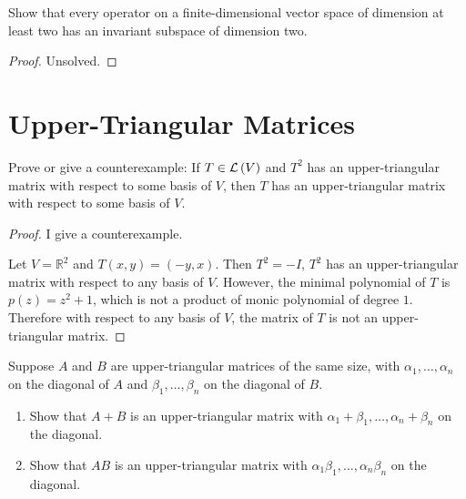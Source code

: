 \begin{exercise}
    Show that every operator on a finite-dimensional vector space of dimension at least two has an invariant subspace of dimension two.
\end{exercise}

\begin{proof}
    Unsolved.
\end{proof}
\newpage

\section{Upper-Triangular Matrices}

\begin{exercise}
    Prove or give a counterexample: If $T \in \mathcal{L}\left({V}\right)$ and $T^{2}$ has an upper-triangular matrix with respect to some basis of $V$, then $T$ has an upper-triangular matrix with respect to some basis of $V$.
\end{exercise}

\begin{proof}
    I give a counterexample.

    Let $V = \mathbb{R}^{2}$ and $T(x, y) = (-y, x)$. Then $T^{2} = -I$, $T^{2}$ has an upper-triangular matrix with respect to any basis of $V$. However, the minimal polynomial of $T$ is $p(z) = z^{2} + 1$, which is not a product of monic polynomial of degree $1$. Therefore with respect to any basis of $V$, the matrix of $T$ is not an upper-triangular matrix.
\end{proof}
\newpage

\begin{exercise}\label{chapter5:sectionC:exercise2}
    Suppose $A$ and $B$ are upper-triangular matrices of the same size, with $\alpha_{1} , \ldots, \alpha_{n}$ on the diagonal of $A$ and $\beta_{1} , \ldots, \beta_{n}$ on the diagonal of $B$.
    \begin{enumerate}[label={(\alph*)}]
        \item Show that $A + B$ is an upper-triangular matrix with $\alpha_{1} + \beta_{1}, \ldots, \alpha_{n} + \beta_{n}$ on the diagonal.
        \item Show that $AB$ is an upper-triangular matrix with $\alpha_{1}\beta_{1}, \ldots, \alpha_{n}\beta_{n}$ on the diagonal.
    \end{enumerate}
\end{exercise}

